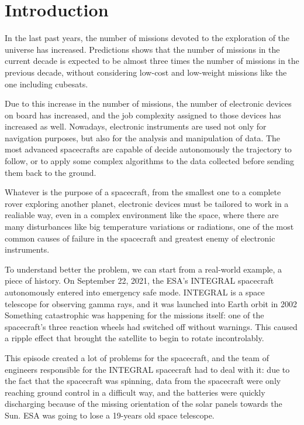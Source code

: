 \chapter{Introduction}
\label{sec:Introduction}

In the last past years, the number of missions devoted to the exploration of the universe has increased. Predictions shows that the number of missions in the current decade is expected to be almost three times the number of missions in the previous decade, without considering low-cost and low-weight missions like the one including cubesats. \bigskip

Due to this increase in the number of missions, the number of electronic devices on board has increased, and the job complexity assigned to those devices has increased as well. Nowadays, electronic instruments are used not only for navigation purposes, but also for the analysis and manipulation of data. The most advanced spacecrafts are capable of decide autonomously the trajectory to follow, or to apply some complex algorithms to the data collected before sending them back to the ground. \bigskip

Whatever is the purpose of a spacecraft, from the smallest one to a complete rover exploring another planet, electronic devices must be tailored to work in a realiable way, even in a complex environment like the space, where there are many disturbances like big temperature variations or radiations, one of the most common causes of failure in the spacecraft and greatest enemy of electronic instruments. \bigskip

To understand better the problem, we can start from a real-world example, a piece of history. On September 22, 2021, the ESA's INTEGRAL spacecraft autonomously entered into emergency safe mode. INTEGRAL is a space telescope for observing gamma rays, and it was launched into Earth orbit in 2002 Something catastrophic was happening for the missions itself: one of the spacecraft's three reaction wheels had switched off without warnings. This caused a ripple effect that brought the satellite to begin to rotate incontrolably. \bigskip

This episode created a lot of problems for the spacecraft, and the team of engineers responsible for the INTEGRAL spacecraft had to deal with it: due to the fact that the spacecraft was spinning, data from the spacecraft were only reaching ground control in a difficult way, and the batteries were quickly discharging because of the missing orientation of the solar panels towards the Sun. ESA was going to lose a 19-years old space telescope. \bigskip

